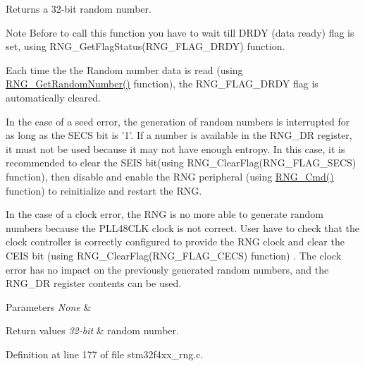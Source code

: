 Returns a 32-\/bit random number. 

\begin{DoxyNote}{Note}
Before to call this function you have to wait till D\-R\-D\-Y (data ready) flag is set, using R\-N\-G\-\_\-\-Get\-Flag\-Status(\-R\-N\-G\-\_\-\-F\-L\-A\-G\-\_\-\-D\-R\-D\-Y) function. 

Each time the the Random number data is read (using \hyperlink{group___r_n_g___group2_ga2cead4780224fd74a3fc15543c98ed36}{R\-N\-G\-\_\-\-Get\-Random\-Number()} function), the R\-N\-G\-\_\-\-F\-L\-A\-G\-\_\-\-D\-R\-D\-Y flag is automatically cleared. 

In the case of a seed error, the generation of random numbers is interrupted for as long as the S\-E\-C\-S bit is '1'. If a number is available in the R\-N\-G\-\_\-\-D\-R register, it must not be used because it may not have enough entropy. In this case, it is recommended to clear the S\-E\-I\-S bit(using R\-N\-G\-\_\-\-Clear\-Flag(\-R\-N\-G\-\_\-\-F\-L\-A\-G\-\_\-\-S\-E\-C\-S) function), then disable and enable the R\-N\-G peripheral (using \hyperlink{group___r_n_g___group1_ga6c1a8372da6e8a06819903c63faecd7b}{R\-N\-G\-\_\-\-Cmd()} function) to reinitialize and restart the R\-N\-G. 

In the case of a clock error, the R\-N\-G is no more able to generate random numbers because the P\-L\-L48\-C\-L\-K clock is not correct. User have to check that the clock controller is correctly configured to provide the R\-N\-G clock and clear the C\-E\-I\-S bit (using R\-N\-G\-\_\-\-Clear\-Flag(\-R\-N\-G\-\_\-\-F\-L\-A\-G\-\_\-\-C\-E\-C\-S) function) . The clock error has no impact on the previously generated random numbers, and the R\-N\-G\-\_\-\-D\-R register contents can be used.
\end{DoxyNote}

\begin{DoxyParams}{Parameters}
{\em None} & \\
\hline
\end{DoxyParams}

\begin{DoxyRetVals}{Return values}
{\em 32-\/bit} & random number. \\
\hline
\end{DoxyRetVals}


Definition at line 177 of file stm32f4xx\-\_\-rng.\-c.

